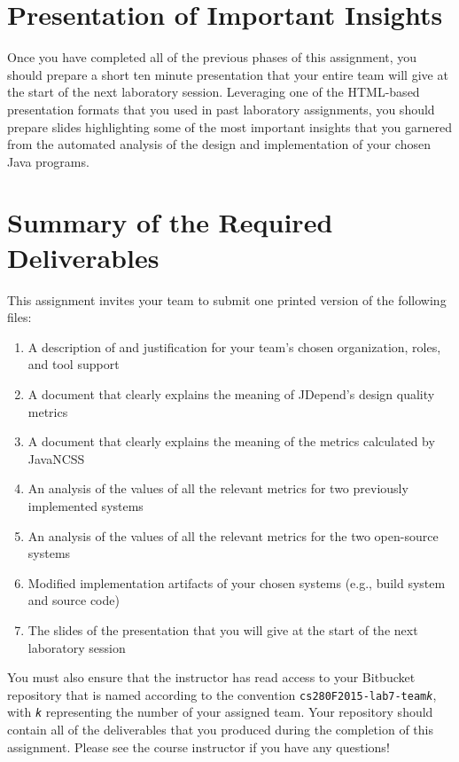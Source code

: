 \section*{Presentation of Important Insights}

Once you have completed all of the previous phases of this assignment, you should prepare a short ten minute
presentation that your entire team will give at the start of the next laboratory session. Leveraging one of the
HTML-based presentation formats that you used in past laboratory assignments, you should prepare slides highlighting
some of the most important insights that you garnered from the automated analysis of the design and implementation of
your chosen Java programs.

\section*{Summary of the Required Deliverables}

This assignment invites your team to submit one printed version of the following files:
\vspace*{-.1in}
\begin{enumerate}
    \itemsep0em
    \item A description of and justification for your team's chosen organization, roles, and tool support
    \item A document that clearly explains the meaning of JDepend's design quality metrics
    \item A document that clearly explains the meaning of the metrics calculated by JavaNCSS
    \item An analysis of the values of all the relevant metrics for two previously implemented systems
    \item An analysis of the values of all the relevant metrics for the two open-source systems
    \item Modified implementation artifacts of your chosen systems (e.g., build system and source code)
    \item The slides of the presentation that you will give at the start of the next laboratory session
\end{enumerate}
\vspace*{-.1in}

You must also ensure that the instructor has read access to your Bitbucket repository that is named according to the
convention {\tt cs280F2015-lab7-team{\em k}}, with {\tt {\em k}} representing the number of your assigned team.  Your
repository should contain all of the deliverables that you produced during the completion of this assignment.  Please
see the course instructor if you have any questions!


